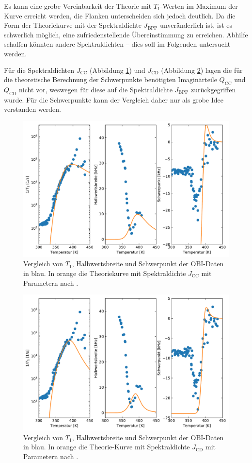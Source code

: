 Es kann eine grobe Vereinbarkeit der Theorie mit $T_1$-Werten im Maximum der Kurve erreicht werden, die Flanken unterscheiden sich jedoch deutlich. Da die Form der Theoriekurve mit der Spektraldichte $J_\text{BPP}$ unveränderlich ist, ist es schwerlich möglich, eine zufriedenstellende Übereinstimmung zu erreichen. Abhilfe schaffen könnten andere Spektraldichten -- dies soll im Folgenden untersucht werden.

Für die Spektraldichten $J_\text{CC}$ (Abbildung \ref{fig:res:theorie_j_cc}) und $J_\text{CD}$ (Abbildung \ref{fig:res:theorie_j_dc}) lagen die für die theoretische Berechnung der Schwerpunkte benötigten Imaginärteile $Q_\text{CC}$ und $Q_\text{CD}$ nicht vor, weswegen für diese auf die Spektraldichte $J_\text{BPP}$ zurückgegriffen wurde. Für die Schwerpunkte kann der Vergleich daher nur als grobe Idee verstanden werden.
\begin{figure}
	\begin{center}
		\includegraphics[width=.8\textwidth]{graphics/plot/OBI_J_cc_01.pdf}
	\end{center}
	\caption{Vergleich von $T_1$, Halbwertsbreite und Schwerpunkt der OBI-Daten in blau. In orange die Theoriekurve mit Spektraldichte $J_\text{CC}$ mit Parametern nach \cite{PIMENOV199793}.} \label{fig:res:theorie_j_cc}
\end{figure}
\begin{figure}
	\begin{center}
		\includegraphics[width=.8\textwidth]{graphics/plot/OBI_J_dc_01.pdf}
	\end{center}
	\caption{Vergleich von $T_1$, Halbwertsbreite und Schwerpunkt der OBI-Daten in blau. In orange die Theorie-Kurve mit Spektraldichte $J_\text{CD}$ mit Parametern nach \cite{PIMENOV199793}.} \label{fig:res:theorie_j_dc}
\end{figure}

